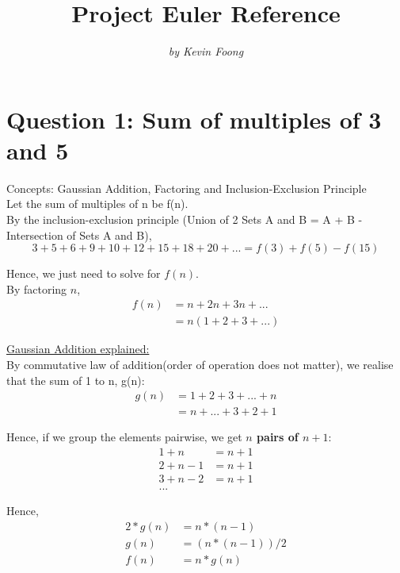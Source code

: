 \documentclass[12pt]{article}
\begin{document}
\setlength{\parindent}{1cm}

\title{\textbf{Project Euler Reference}}  
\author{\textit{by Kevin Foong}}
\date{}
\maketitle

\section{Question 1: Sum of multiples of 3 and 5} 
Concepts: Gaussian Addition, Factoring and Inclusion-Exclusion Principle \\[\baselineskip]

Let the sum of multiples of n be f(n). \\

By the inclusion-exclusion principle (Union of 2 Sets A and B = A + B - Intersection of Sets A and B), 
\[ 3 + 5 + 6 + 9 + 10 + 12 + 15 + 18 + 20 + ... = f(3) + f(5) - f(15) \]

Hence, we just need to solve for \(f(n)\). \\

By factoring \(n\), 
\begin{align*}
f(n) & = n + 2n + 3n + ... \\
      & = n(1 + 2 + 3 + ...) 
\end{align*} 

{\underline{Gaussian Addition explained:}} \\[\baselineskip]

By commutative law of addition(order of operation does not matter), we realise that the sum of 1 to n, g(n): 
\begin{align*}
g(n) & = 1 + 2 + 3 + ... + n \\
       & = n + ... + 3 + 2 + 1
\end{align*}

Hence, if we group the elements pairwise, we get {\textbf{\(n\) pairs of \(n + 1\)}}: 
\begin{align*}
 1 + n & = n + 1 \\ 
 2 + n - 1 & = n + 1 \\ 
 3 + n - 2 & = n + 1 \\
 ... 
\end{align*}

Hence, 
\begin{align}
 2 * g(n) & = n * (n - 1) \nonumber \\
 g(n) & = (n * (n - 1)) / 2 \\ 
 f(n) & = n * g(n) 
\end{align}
\end{document}
